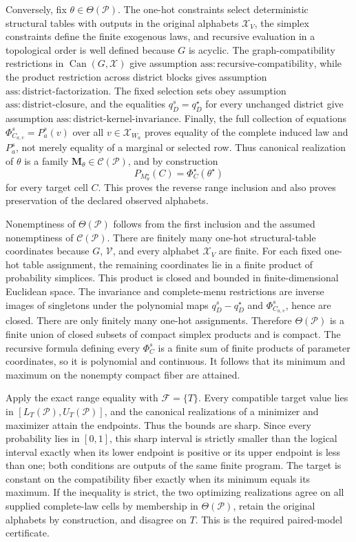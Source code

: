 Conversely, fix \(\theta\in\Theta(\mathcal P)\).  The one-hot constraints select deterministic structural tables with outputs in the original alphabets \(\mathcal X_V\), the simplex constraints define the finite exogenous laws, and recursive evaluation in a topological order is well defined because \(G\) is acyclic.  The graph-compatibility restrictions in \(\operatorname{Can}(G,\mathcal X)\) give assumption \(\mathrm{ass:recursive\text{-}compatibility}\), while the product restriction across district blocks gives assumption \(\mathrm{ass:district\text{-}factorization}\).  The fixed selection sets obey assumption \(\mathrm{ass:district\text{-}closure}\), and the equalities
\(
q_D^s=q_D^\star
\)
for every unchanged district give assumption \(\mathrm{ass:district\text{-}kernel\text{-}invariance}\).  Finally, the full collection of equations
\(
\Phi_{C_{a,v}}^s=P_a^s(v)
\)
over all \(v\in\mathcal X_{W_a}\) proves equality of the complete induced law and \(P_a^s\), not merely equality of a marginal or selected row.  Thus canonical realization of \(\theta\) is a family \(\mathbf M_\theta\in\mathcal C(\mathcal P)\), and by construction
\[
 P_{M_\theta^\star}(C)=\Phi_C^\star(\theta^\star)
\]
for every target cell \(C\).  This proves the reverse range inclusion and also proves preservation of the declared observed alphabets.

Nonemptiness of \(\Theta(\mathcal P)\) follows from the first inclusion and the assumed nonemptiness of \(\mathcal C(\mathcal P)\).  There are finitely many one-hot structural-table coordinates because \(G\), \(\mathcal V\), and every alphabet \(\mathcal X_V\) are finite.  For each fixed one-hot table assignment, the remaining coordinates lie in a finite product of probability simplices.  This product is closed and bounded in finite-dimensional Euclidean space.  The invariance and complete-menu restrictions are inverse images of singletons under the polynomial maps \(q_D^s-q_D^\star\) and \(\Phi_{C_{a,v}}^s\), hence are closed.  There are only finitely many one-hot assignments.  Therefore \(\Theta(\mathcal P)\) is a finite union of closed subsets of compact simplex products and is compact.  The recursive formula defining every \(\Phi_C^s\) is a finite sum of finite products of parameter coordinates, so it is polynomial and continuous.  It follows that its minimum and maximum on the nonempty compact fiber are attained.

Apply the exact range equality with \(\mathcal F=\{T\}\).  Every compatible target value lies in
\(
[L_T(\mathcal P),U_T(\mathcal P)]
\), and the canonical realizations of a minimizer and maximizer attain the endpoints.  Thus the bounds are sharp.  Since every probability lies in \([0,1]\), this sharp interval is strictly smaller than the logical interval exactly when its lower endpoint is positive or its upper endpoint is less than one; both conditions are outputs of the same finite program.  The target is constant on the compatibility fiber exactly when its minimum equals its maximum.  If the inequality is strict, the two optimizing realizations agree on all supplied complete-law cells by membership in \(\Theta(\mathcal P)\), retain the original alphabets by construction, and disagree on \(T\).  This is the required paired-model certificate.

